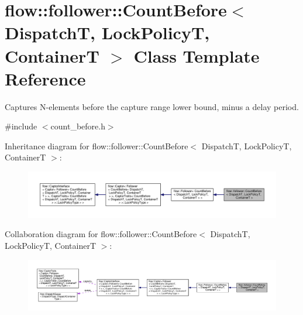\hypertarget{classflow_1_1follower_1_1_count_before}{}\section{flow\+:\+:follower\+:\+:Count\+Before$<$ DispatchT, Lock\+PolicyT, ContainerT $>$ Class Template Reference}
\label{classflow_1_1follower_1_1_count_before}


Captures N-\/elements before the capture range lower bound, minus a delay period.  




{\ttfamily \#include $<$count\+\_\+before.\+h$>$}



Inheritance diagram for flow\+:\+:follower\+:\+:Count\+Before$<$ DispatchT, Lock\+PolicyT, ContainerT $>$\+:\nopagebreak
\begin{figure}[H]
\begin{center}
\leavevmode
\includegraphics[width=350pt]{classflow_1_1follower_1_1_count_before__inherit__graph}
\end{center}
\end{figure}


Collaboration diagram for flow\+:\+:follower\+:\+:Count\+Before$<$ DispatchT, Lock\+PolicyT, ContainerT $>$\+:\nopagebreak
\begin{figure}[H]
\begin{center}
\leavevmode
\includegraphics[width=350pt]{classflow_1_1follower_1_1_count_before__coll__graph}
\end{center}
\end{figure}
